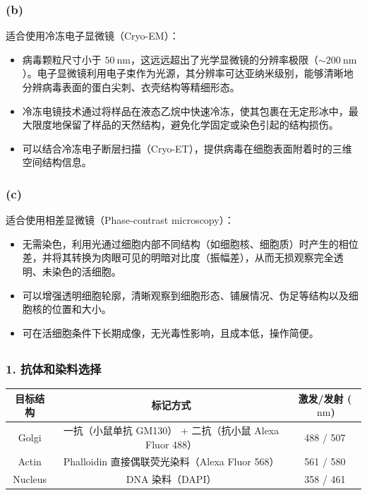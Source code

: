 \documentclass[10pt]{article}
\begin{document}
\subsubsection*{(b)}
适合使用冷冻电子显微镜（Cryo-EM）：
\begin{itemize}
    \item 病毒颗粒尺寸小于 $\qty{50}{\nm}$，这远远超出了光学显微镜的分辨率极限（$\sim \qty{200}{\nm}$）。电子显微镜利用电子束作为光源，其分辨率可达亚纳米级别，能够清晰地分辨病毒表面的蛋白尖刺、衣壳结构等精细形态。
    \item 冷冻电镜技术通过将样品在液态乙烷中快速冷冻，使其包裹在无定形冰中，最大限度地保留了样品的天然结构，避免化学固定或染色引起的结构损伤。
    \item 可以结合冷冻电子断层扫描（Cryo-ET），提供病毒在细胞表面附着时的三维空间结构信息。
\end{itemize}

\subsubsection*{(c)}
适合使用相差显微镜（Phase-contrast microscopy）：
\begin{itemize}
    \item 无需染色，利用光通过细胞内部不同结构（如细胞核、细胞质）时产生的相位差，并将其转换为肉眼可见的明暗对比度（振幅差），从而无损观察完全透明、未染色的活细胞。
    \item 可以增强透明细胞轮廓，清晰观察到细胞形态、铺展情况、伪足等结构以及细胞核的位置和大小。
    \item 可在活细胞条件下长期成像，无光毒性影响，且成本低，操作简便。
\end{itemize}

\subsection{}
\subsubsection*{1. 抗体和染料选择}

\capstartfalse
\begin{table}[h!]
\centering
\begin{tabular}{@{}ccc@{}}
\toprule
\textbf{目标结构} & \textbf{标记方式} & \textbf{激发/发射 ($\qty{}{\nm}$)} \\ \midrule
Golgi & 一抗（小鼠单抗 GM130） + 二抗（抗小鼠 Alexa Fluor 488） & 488 / 507 \\
Actin & Phalloidin 直接偶联荧光染料（Alexa Fluor 568） & 561 / 580 \\
Nucleus & DNA 染料（DAPI） & 358 / 461 \\ \bottomrule
\end{tabular}
\end{table}
\capstarttrue
\end{document}

